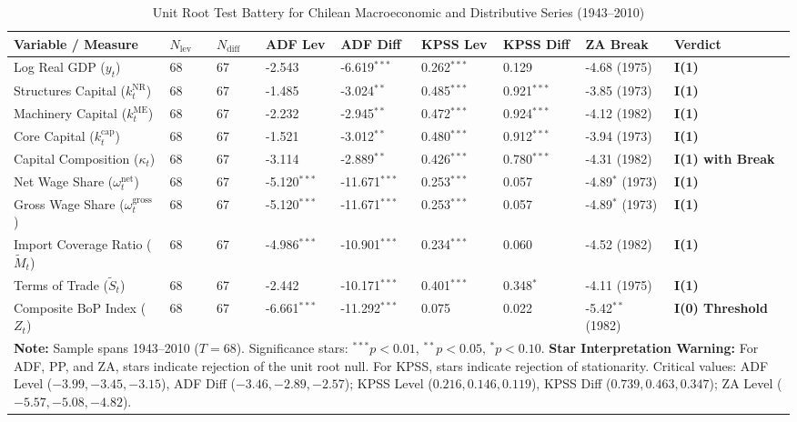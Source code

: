 \begin{table}[h!]
\centering
\footnotesize
\setlength{\tabcolsep}{2.5pt}
\caption{Unit Root Test Battery for Chilean Macroeconomic and Distributive Series (1943--2010)}
\label{tab:chile_urca_macro}
\begin{tabular}{p{4.2cm} p{0.5cm} p{0.5cm} p{1.1cm} p{1.1cm} p{1.1cm} p{1.1cm} p{1.8cm} p{1.8cm}}
\toprule
\textbf{Variable / Measure} & \textbf{$N_{\text{lev}}$} & \textbf{$N_{\text{diff}}$} & \textbf{ADF Lev} & \textbf{ADF Diff} & \textbf{KPSS Lev} & \textbf{KPSS Diff} & \textbf{ZA Break} & \textbf{Verdict} \\
\midrule
Log Real GDP ($y_t$) & 68 & 67 & -2.543 & -6.619$^{***}$ & 0.262$^{***}$ & 0.129 & -4.68 (1975) & \textbf{I(1)} \\
Structures Capital ($k^{\text{NR}}_t$) & 68 & 67 & -1.485 & -3.024$^{**}$ & 0.485$^{***}$ & 0.921$^{***}$ & -3.85 (1973) & \textbf{I(1)} \\
Machinery Capital ($k^{\text{ME}}_t$) & 68 & 67 & -2.232 & -2.945$^{**}$ & 0.472$^{***}$ & 0.924$^{***}$ & -4.12 (1982) & \textbf{I(1)} \\
Core Capital ($k^{\text{cap}}_t$) & 68 & 67 & -1.521 & -3.012$^{**}$ & 0.480$^{***}$ & 0.912$^{***}$ & -3.94 (1973) & \textbf{I(1)} \\
Capital Composition ($\kappa_t$) & 68 & 67 & -3.114 & -2.889$^{**}$ & 0.426$^{***}$ & 0.780$^{***}$ & -4.31 (1982) & \textbf{I(1) with Break} \\
Net Wage Share ($\omega^{\text{net}}_t$) & 68 & 67 & -5.120$^{***}$ & -11.671$^{***}$ & 0.253$^{***}$ & 0.057 & -4.89$^{*}$ (1973) & \textbf{I(1)} \\
Gross Wage Share ($\omega^{\text{gross}}_t$) & 68 & 67 & -5.120$^{***}$ & -11.671$^{***}$ & 0.253$^{***}$ & 0.057 & -4.89$^{*}$ (1973) & \textbf{I(1)} \\
Import Coverage Ratio ($\tilde{M}_t$) & 68 & 67 & -4.986$^{***}$ & -10.901$^{***}$ & 0.234$^{***}$ & 0.060 & -4.52 (1982) & \textbf{I(1)} \\
Terms of Trade ($\tilde{S}_t$) & 68 & 67 & -2.442 & -10.171$^{***}$ & 0.401$^{***}$ & 0.348$^{*}$ & -4.11 (1975) & \textbf{I(1)} \\
Composite BoP Index ($Z_t$) & 68 & 67 & -6.661$^{***}$ & -11.292$^{***}$ & 0.075 & 0.022 & -5.42$^{**}$ (1982) & \textbf{I(0) Threshold} \\
\bottomrule
\multicolumn{9}{p{14.5cm}}{\footnotesize \textbf{Note:} Sample spans 1943--2010 ($T=68$). Significance stars: $^{***} p < 0.01$, $^{**} p < 0.05$, $^{*} p < 0.10$. \textbf{Star Interpretation Warning:} For ADF, PP, and ZA, stars indicate rejection of the unit root null. For KPSS, stars indicate rejection of stationarity. Critical values: ADF Level ($-3.99, -3.45, -3.15$), ADF Diff ($-3.46, -2.89, -2.57$); KPSS Level ($0.216, 0.146, 0.119$), KPSS Diff ($0.739, 0.463, 0.347$); ZA Level ($-5.57, -5.08, -4.82$).}
\end{tabular}
\end{table}


